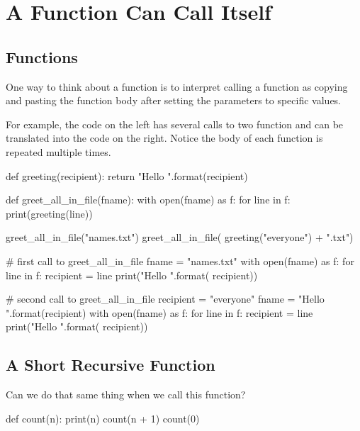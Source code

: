 \documentclass[11pt]{cselabheader}
\begin{document}
\tableofcontents

\pagebreak
{}

\section{A Function Can Call Itself}
\subsection{Functions}
One way to think about a function is to interpret calling a
function as copying and pasting the function body after setting the
parameters to specific values.

For example, the code on the left has several calls to two function
and can be translated into the code on the right. Notice the
body of each function is repeated multiple times.

\begin{multicols}{2}
\begin{python3code}
def greeting(recipient):
    return "Hello {}".format(recipient)

def greet_all_in_file(fname):
    with open(fname) as f:
        for line in f:
            print(greeting(line))

greet_all_in_file("names.txt")
greet_all_in_file(
    greeting("everyone") + ".txt")
\end{python3code}
\columnbreak
\begin{python3code}
# first call to greet_all_in_file
fname = "names.txt"
with open(fname) as f:
    for line in f:
        recipient = line
        print("Hello {}".format(
            recipient))

# second call to greet_all_in_file
recipient = "everyone"
fname = "Hello {}".format(recipient)
with open(fname) as f:
    for line in f:
        recipient = line
        print("Hello {}".format(
            recipient))
\end{python3code}
\end{multicols}

\subsection{A Short Recursive Function}

Can we do that same thing when we call this function?

\begin{python3code}
def count(n):
    print(n)
    count(n + 1)
count(0)
\end{python3code}
\end{document}
